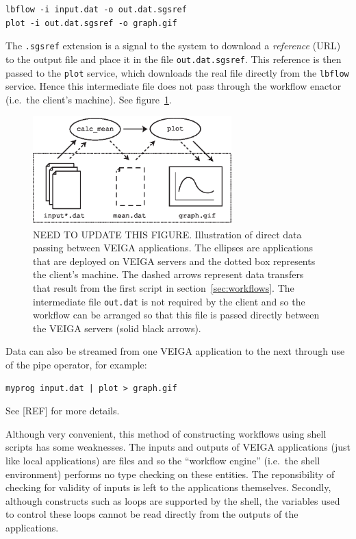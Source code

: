 \documentclass[a4paper]{article}
\begin{document}
\begin{multicols}{2}
\begin{verbatim}
lbflow -i input.dat -o out.dat.sgsref
plot -i out.dat.sgsref -o graph.gif
\end{verbatim}

The {\tt .sgsref} extension is a signal to the system to download a {\em reference\/} (URL) to the output file and place it in the file {\tt out.dat.sgsref}.  This reference is then passed to the {\tt plot} service, which downloads the real file directly from the {\tt lbflow} service.  Hence this intermediate file does not pass through the workflow enactor (i.e.\ the client's machine).  See figure~\ref{fig:datapassing}.

\begin{figure}
\centering
\includegraphics[height=4.2cm]{datapassing.eps}
\caption{NEED TO UPDATE THIS FIGURE. Illustration of direct data passing between VEIGA applications.  The ellipses are applications that are deployed on VEIGA servers and the dotted box represents the client's machine.  The dashed arrows represent data transfers that result from the first script in section~\ref{sec:workflows}.  The intermediate file {\tt out.dat} is not required by the client and so the workflow can be arranged so that this file is passed directly between the VEIGA servers (solid black arrows).}\label{fig:datapassing}
\end{figure}

Data can also be streamed from one VEIGA application to the next through use of the pipe operator, for example:

\begin{verbatim}
myprog input.dat | plot > graph.gif
\end{verbatim}
See [REF] for more details.

Although very convenient, this method of constructing workflows using shell scripts has some weaknesses. The inputs and outputs of VEIGA applications (just like local applications) are files and so the ``workflow engine'' (i.e.\ the shell environment) performs no type checking on these entities.  The reponsibility of checking for validity of inputs is left to the applications themselves.  Secondly, although constructs such as loops are supported by the shell, the variables used to control these loops cannot be read directly from the outputs of the applications.


\end{multicols}
\end{document}
